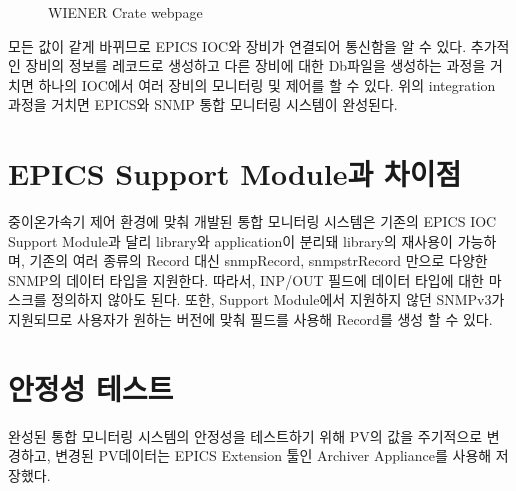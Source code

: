 \documentclass[11pt
  , a4paper
  , article
  , oneside
]{memoir}
\begin{document}
\begin{figure}[!h]
  \centering
              \hfill
              \hfill
  \caption
      {
WIENER Crate webpage
      }
 \label{fig:wienerweb}
\end{figure}

모든 값이 같게 바뀌므로 EPICS IOC와 장비가 연결되어 통신함을 알 수 있다. 추가적인 장비의 정보를 레코드로 생성하고 다른 장비에 대한 Db파일을 생성하는 과정을 거치면 하나의 IOC에서 여러 장비의 모니터링 및 제어를 할 수 있다. 위의 integration 과정을 거치면 EPICS와 SNMP 통합 모니터링 시스템이 완성된다.

\section{EPICS Support Module과 차이점}
중이온가속기 제어 환경에 맞춰 개발된 통합 모니터링 시스템은 기존의 EPICS IOC Support Module과 달리 library와 application이 분리돼 library의 재사용이 가능하며, 기존의 여러 종류의 Record 대신 snmpRecord, snmpstrRecord 만으로 다양한 SNMP의 데이터 타입을 지원한다. 따라서, INP/OUT 필드에 데이터 타입에 대한 마스크를 정의하지 않아도 된다. 또한, Support Module에서 지원하지 않던 SNMPv3가 지원되므로 사용자가 원하는 버전에 맞춰 필드를 사용해 Record를 생성 할 수 있다.

\section{안정성 테스트}
완성된 통합 모니터링 시스템의 안정성을 테스트하기 위해 PV의 값을 주기적으로 변경하고, 변경된 PV데이터는 EPICS Extension 툴인 Archiver Appliance를 사용해 저장했다.
\end{document}
